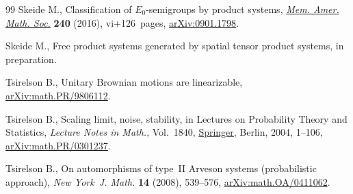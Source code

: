 \documentclass[pdftex]{sigma}%
\numberwithin{equation}{section}
\begin{document}
\begin{thebibliography}{99}
Skeide M., Classification of {$E_0$}-semigroups by product systems,
 \href{https://doi.org/10.1090/memo/1137}{\textit{Mem. Amer. Math. Soc.}} \textbf{240} (2016), vi+126~pages,
 \href{https://arxiv.org/abs/0901.1798}{arXiv:0901.1798}.

Skeide M., Free product systems generated by spatial tensor product systems, in
 preparation.

Tsirelson B., Unitary {B}rownian motions are linearizable,
 \href{https://arxiv.org/abs/math.PR/9806112}{arXiv:math.PR/9806112}.

Tsirelson B., Scaling limit, noise, stability, in Lectures on Probability
 Theory and Statistics, \textit{Lecture Notes in Math.}, Vol.~1840, \href{https://doi.org/10.1007/978-3-540-39982-7_1}{Springer},
 Berlin, 2004, 1--106, \href{https://arxiv.org/abs/math.PR/0301237}{arXiv:math.PR/0301237}.

Tsirelson B., On automorphisms of type~{II} {A}rveson systems (probabilistic
 approach), \textit{New York~J. Math.} \textbf{14} (2008), 539--576,
 \href{https://arxiv.org/abs/math.OA/0411062}{arXiv:math.OA/0411062}.

\end{thebibliography}\LastPageEnding
\end{document}

